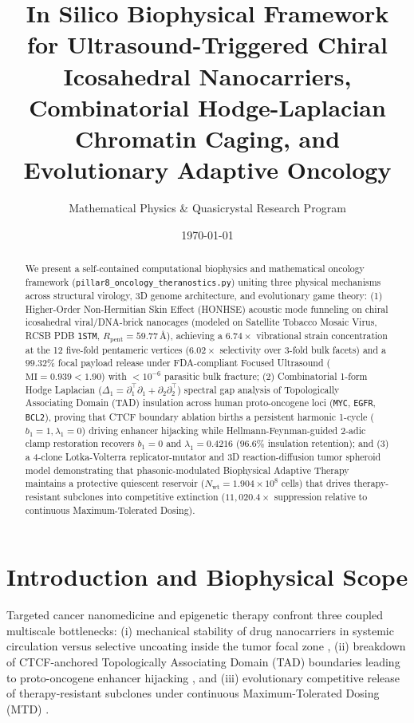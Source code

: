 \documentclass[aps,prx,twocolumn,superscriptaddress,longbibliography,nofootinbib]{revtex4-2}
\begin{document}
\title{In Silico Biophysical Framework for Ultrasound-Triggered Chiral Icosahedral Nanocarriers, Combinatorial Hodge-Laplacian Chromatin Caging, and Evolutionary Adaptive Oncology}

\author{Mathematical Physics \& Quasicrystal Research Program}
\date{\today}

\begin{abstract}
We present a self-contained computational biophysics and mathematical oncology framework (\texttt{pillar8\_oncology\_theranostics.py}) uniting three physical mechanisms across structural virology, 3D genome architecture, and evolutionary game theory: (1) Higher-Order Non-Hermitian Skin Effect (HONHSE) acoustic mode funneling on chiral icosahedral viral/DNA-brick nanocages (modeled on Satellite Tobacco Mosaic Virus, RCSB PDB \texttt{1STM}, $R_{\mathrm{pent}} = 59.77\,\text{\AA}$), achieving a $6.74\times$ vibrational strain concentration at the 12 five-fold pentameric vertices ($6.02\times$ selectivity over 3-fold bulk facets) and a $99.32\%$ focal payload release under FDA-compliant Focused Ultrasound ($\mathrm{MI} = 0.939 < 1.90$) with $< 10^{-6}$ parasitic bulk fracture; (2) Combinatorial 1-form Hodge Laplacian ($\Delta_1 = \partial_1^\top\partial_1 + \partial_2\partial_2^\top$) spectral gap analysis of Topologically Associating Domain (TAD) insulation across human proto-oncogene loci (\texttt{MYC}, \texttt{EGFR}, \texttt{BCL2}), proving that CTCF boundary ablation births a persistent harmonic 1-cycle ($b_1 = 1, \lambda_1 = 0$) driving enhancer hijacking while Hellmann-Feynman-guided 2-adic clamp restoration recovers $b_1 = 0$ and $\lambda_1 = 0.4216$ ($96.6\%$ insulation retention); and (3) a 4-clone Lotka-Volterra replicator-mutator and 3D reaction-diffusion tumor spheroid model demonstrating that phasonic-modulated Biophysical Adaptive Therapy maintains a protective quiescent reservoir ($N_{\mathrm{wt}} = 1.904 \times 10^8$ cells) that drives therapy-resistant subclones into competitive extinction ($11,020.4\times$ suppression relative to continuous Maximum-Tolerated Dosing).
\end{abstract}

\maketitle

\section{Introduction and Biophysical Scope}
Targeted cancer nanomedicine and epigenetic therapy confront three coupled multiscale bottlenecks: (i) mechanical stability of drug nanocarriers in systemic circulation versus selective uncoating inside the tumor focal zone \cite{Larson1993,Twarock2004,Ke2012,Shapiro2014}, (ii) breakdown of CTCF-anchored Topologically Associating Domain (TAD) boundaries leading to proto-oncogene enhancer hijacking \cite{Sanborn2015}, and (iii) evolutionary competitive release of therapy-resistant subclones under continuous Maximum-Tolerated Dosing (MTD) \cite{Gatenby2009,Zhang2017}.
\end{document}
